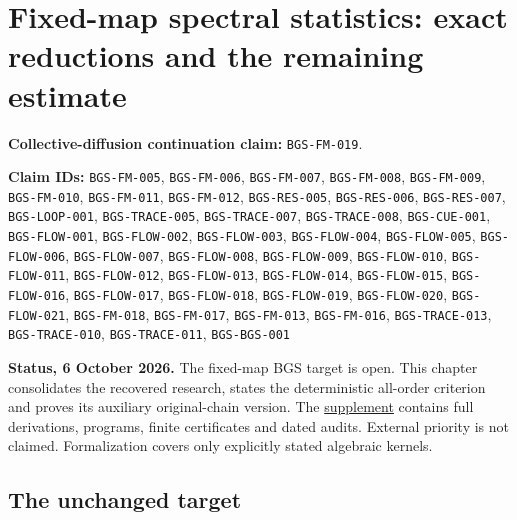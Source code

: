 \hypertarget{fixed-map-spectral-statistics-exact-reductions-and-the-remaining-estimate}{%
\section{Fixed-map spectral statistics: exact reductions and the remaining estimate}\label{fixed-map-spectral-statistics-exact-reductions-and-the-remaining-estimate}}

\textbf{Collective-diffusion continuation claim:} \texttt{BGS-FM-019}.

{\sloppy\textbf{Claim IDs:} \texttt{BGS-FM-005}, \texttt{BGS-FM-006}, \texttt{BGS-FM-007}, \texttt{BGS-FM-008}, \texttt{BGS-FM-009}, \texttt{BGS-FM-010}, \texttt{BGS-FM-011}, \texttt{BGS-FM-012}, \texttt{BGS-RES-005}, \texttt{BGS-RES-006}, \texttt{BGS-RES-007}, \texttt{BGS-LOOP-001}, \texttt{BGS-TRACE-005}, \texttt{BGS-TRACE-007}, \texttt{BGS-TRACE-008}, \texttt{BGS-CUE-001}, \texttt{BGS-FLOW-001}, \texttt{BGS-FLOW-002}, \texttt{BGS-FLOW-003}, \texttt{BGS-FLOW-004}, \texttt{BGS-FLOW-005}, \texttt{BGS-FLOW-006}, \texttt{BGS-FLOW-007}, \texttt{BGS-FLOW-008}, \texttt{BGS-FLOW-009}, \texttt{BGS-FLOW-010}, \texttt{BGS-FLOW-011}, \texttt{BGS-FLOW-012}, \texttt{BGS-FLOW-013}, \texttt{BGS-FLOW-014}, \texttt{BGS-FLOW-015}, \texttt{BGS-FLOW-016}, \texttt{BGS-FLOW-017}, \texttt{BGS-FLOW-018}, \texttt{BGS-FLOW-019}, \texttt{BGS-FLOW-020}, \texttt{BGS-FLOW-021}, \texttt{BGS-FM-018}, \texttt{BGS-FM-017}, \texttt{BGS-FM-013}, \texttt{BGS-FM-016}, \texttt{BGS-TRACE-013}, \texttt{BGS-TRACE-010}, \texttt{BGS-TRACE-011}, \texttt{BGS-BGS-001}\par}

\textbf{Status, 6 October 2026.} The fixed-map BGS target is open. This chapter
consolidates the recovered research, states the deterministic all-order
criterion and proves its auxiliary original-chain version. The
\href{https://github.com/ChurilovMaksim/BGS/blob/main/supplement/fixed_map/README.md}{supplement} contains full derivations,
programs, finite certificates and dated audits. External priority is not
claimed. Formalization covers only explicitly stated algebraic kernels.

\hypertarget{the-unchanged-target}{%
\subsection{The unchanged target}\label{the-unchanged-target}}

